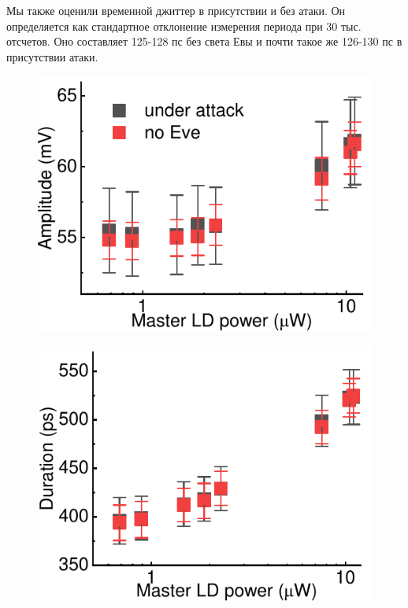 Мы также оценили временной джиттер в присутствии и без атаки. Он определяется как стандартное отклонение измерения периода при 30 тыс. отсчетов. Оно составляет 125-128 пс  без света Евы и почти такое же 126-130 пс в присутствии атаки. 

\begin{figure}%
	\centering
	\includegraphics[width=\linewidth]{images/amplitude_change.pdf}
	\caption{}
\end{figure}

\begin{figure}%
	\includegraphics[width=\linewidth]{images/duration_change.pdf}
	\caption{}
\end{figure}

